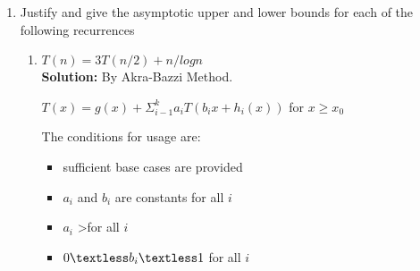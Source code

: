 \documentclass[12pt]{article}
\begin{document}
\begin{enumerate}
\begin{enumerate}
\begin{enumerate}
\item {If $f(n) = O(h(n))$ and $g(n) = O(h(n))$, then $f(n) \cdot g(n) = O(h(n))$} \\
\textbf{Solution:} The above statement is incorrect and the proof is as follows:\\            
\textbf{Given:}  $f(n) = O(h(n))$ and $g(n) = O(h(n))$\\       
\textbf{To Prove:} $f(n)\cdot g(n) = O(h(n))$\\
\textbf{Proof:} We have $f(n) = O(h(n))$ \\
By definition, $\exists$ c$_{1}$$\textgreater$0, n$_{0}\ge$0: $\forall$ n$\textgreater$n$_{0}$: $f(n) \le$ c$_{1}$$h(n)$ \hfill (Equation 1)\\  
Also, $g(n) = O(h(n))$ \\
By definition, $\exists$ c$_{2}$$\textgreater$0, n$_{0}\ge$0: $\forall$ n$\textgreater$n$_{0}$: $f(n) \le$ c$_{2}$$h(n)$ \hfill (Equation 2)\\ 
L.H.S. = $ f(n)\cdot g(n) \le $c$_{1}h(n)$$\cdot$c$_{2}h(n) $\hfill [From 1 and 2]\\
L.H.S. = (c$_{1}$ $\cdot$ c$_{2}$)$h(n)^{2}$\\
L.H.S. = c$h(n)^{2}$ \hfill [where c = c$_{1}$$\cdot$c$_{2}$]\\
Therefore, $f(n) \cdot g(n) \le $ c$h(n)^{2} \hfill [h(n) \neq h(n)^{2}]$\\
but $f(n)\cdot g(n) \textless O(h(n)^{2})$ Hence Statement is False.\\
\end{enumerate}
\item 
{Justify and give the asymptotic upper and lower bounds for each of the following recurrences}
\begin{enumerate}
\item {$ T(n) = 3T(n/2) + n/logn $} \\
\textbf{Solution:}  By Akra-Bazzi Method\cite{akba}.
\begin{center}
$ T(x) = g(x) + \Sigma^{k}_{i-1}a_{i}T(b_{i}x + h_{i}(x))$ for $x \ge x_{0}$
\end{center}
The conditions for usage are:
\begin{itemize}
	\item {sufficient base cases are provided}
	\item {$a_{i}$ and $b_{i}$ are constants for all $i$}
	\item {$a_{i}$ \textgreater for all $i$}
	\item {$ 0 \textless b_{i} \textless 1 $ for all $i$}

\end{itemize}
\end{enumerate}
\end{enumerate}
\end{enumerate}
\end{document}
